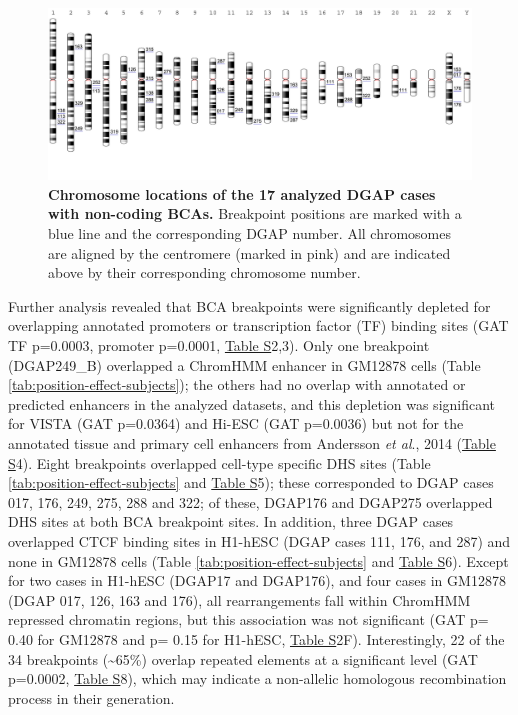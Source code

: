 \documentclass[a4paper,twoside=true,openright,parskip=full,chapterprefix=true,11pt,headings=normal,bibliography=totoc,listof=totoc,titlepage=on,captions=tableabove,draft=false]{scrreprt}
\theoremstyle{definition}
\theoremstyle{definition}
\theoremstyle{definition}
\theoremstyle{remark}
\begin{document}
\begin{figure}

{\centering \includegraphics[width=1\linewidth]{figures/position_effect/Figure1} 

}

\caption{\textbf{Chromosome locations of the 17 analyzed
DGAP cases with non-coding BCAs.} Breakpoint positions are marked with a
blue line and the corresponding DGAP number. All chromosomes are aligned
by the centromere (marked in pink) and are indicated above by their
corresponding chromosome number.}\label{fig:position-effect-1}
\end{figure}







Further analysis revealed that BCA breakpoints were significantly
depleted for overlapping annotated promoters or transcription factor
(TF) binding sites (GAT TF p=0.0003, promoter p=0.0001,
\protect\hyperlink{position-effect-sub-tab}{Table S}2,3). Only one
breakpoint (DGAP249\_B) overlapped a ChromHMM enhancer in GM12878 cells
(Table \ref{tab:position-effect-subjects}); the others had no overlap
with annotated or predicted enhancers in the analyzed datasets, and this
depletion was significant for VISTA (GAT p=0.0364) and Hi-ESC (GAT
p=0.0036) but not for the annotated tissue and primary cell enhancers
from Andersson \emph{et al}., 2014\citep{Andersson2014}
(\protect\hyperlink{position-effect-sub-tab}{Table S}4). Eight
breakpoints overlapped cell-type specific DHS sites (Table
\ref{tab:position-effect-subjects} and
\protect\hyperlink{position-effect-sub-tab}{Table S}5); these
corresponded to DGAP cases 017, 176, 249, 275, 288 and 322; of these,
DGAP176 and DGAP275 overlapped DHS sites at both BCA breakpoint sites.
In addition, three DGAP cases overlapped CTCF binding sites in H1-hESC
(DGAP cases 111, 176, and 287) and none in GM12878 cells (Table
\ref{tab:position-effect-subjects} and
\protect\hyperlink{position-effect-sub-tab}{Table S}6). Except for two
cases in H1-hESC (DGAP17 and DGAP176), and four cases in GM12878 (DGAP
017, 126, 163 and 176), all rearrangements fall within ChromHMM
repressed chromatin regions, but this association was not significant
(GAT p= 0.40 for GM12878 and p= 0.15 for H1-hESC,
\protect\hyperlink{position-effect-sub-tab}{Table S}2F). Interestingly,
22 of the 34 breakpoints (\textasciitilde{}65\%) overlap repeated
elements at a significant level (GAT p=0.0002,
\protect\hyperlink{position-effect-sub-tab}{Table S}8), which may
indicate a non-allelic homologous recombination process in their
generation.\citep{Gu2008, Cardoso2016}
\end{document}
